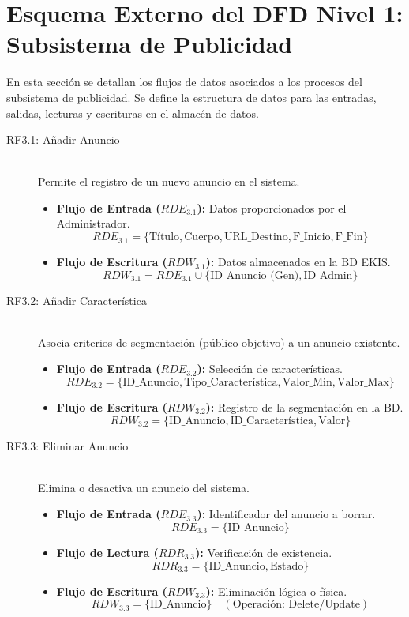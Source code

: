 \section{Esquema Externo del DFD Nivel 1: Subsistema de Publicidad}

En esta sección se detallan los flujos de datos asociados a los procesos del subsistema de publicidad. Se define la estructura de datos para las entradas, salidas, lecturas y escrituras en el almacén de datos.

\begin{description}
    \item[RF3.1: Añadir Anuncio] \hfill \\
    Permite el registro de un nuevo anuncio en el sistema.
    \begin{itemize}
        \item \textbf{Flujo de Entrada ($RDE_{3.1}$):} Datos proporcionados por el Administrador.
        \[ RDE_{3.1} = \{ \text{Título}, \text{Cuerpo}, \text{URL\_Destino}, \text{F\_Inicio}, \text{F\_Fin} \} \]
        \item \textbf{Flujo de Escritura ($RDW_{3.1}$):} Datos almacenados en la BD EKIS.
        \[ RDW_{3.1} = RDE_{3.1} \cup \{ \text{ID\_Anuncio (Gen)}, \text{ID\_Admin} \} \]
    \end{itemize}

    \item[RF3.2: Añadir Característica] \hfill \\
    Asocia criterios de segmentación (público objetivo) a un anuncio existente.
    \begin{itemize}
        \item \textbf{Flujo de Entrada ($RDE_{3.2}$):} Selección de características.
        \[ RDE_{3.2} = \{ \text{ID\_Anuncio}, \text{Tipo\_Característica}, \text{Valor\_Min}, \text{Valor\_Max} \} \]
        \item \textbf{Flujo de Escritura ($RDW_{3.2}$):} Registro de la segmentación en la BD.
        \[ RDW_{3.2} = \{ \text{ID\_Anuncio}, \text{ID\_Característica}, \text{Valor} \} \]
    \end{itemize}

    \item[RF3.3: Eliminar Anuncio] \hfill \\
    Elimina o desactiva un anuncio del sistema.
    \begin{itemize}
        \item \textbf{Flujo de Entrada ($RDE_{3.3}$):} Identificador del anuncio a borrar.
        \[ RDE_{3.3} = \{ \text{ID\_Anuncio} \} \]
        \item \textbf{Flujo de Lectura ($RDR_{3.3}$):} Verificación de existencia.
        \[ RDR_{3.3} = \{ \text{ID\_Anuncio}, \text{Estado} \} \]
        \item \textbf{Flujo de Escritura ($RDW_{3.3}$):} Eliminación lógica o física.
        \[ RDW_{3.3} = \{ \text{ID\_Anuncio} \} \quad (\text{Operación: Delete/Update}) \]
    \end{itemize}


\end{description}
